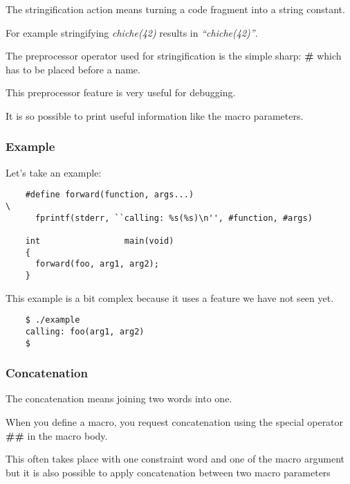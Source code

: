 {\begin{frame}
  The stringification action means turning a code fragment into
  a string constant.

  \nl

  For example stringifying \textit{chiche(42)} results in
  \textit{``chiche(42)''}.

  \nl

  The preprocessor operator used for stringification is the simple sharp:
  \textbf{\#} which has to be placed before a name.

  \nl

  This preprocessor feature is very useful for debugging.

  \nl

  It is so possible to print useful information like the macro parameters.
\end{frame}


\begin{frame}[containsverbatim]
  \frametitle{Example}

  Let's take an example:

  \begin{verbatim}
    #define forward(function, args...)                                  \
      fprintf(stderr, ``calling: %s(%s)\n'', #function, #args)

    int                 main(void)
    {
      forward(foo, arg1, arg2);
    }
  \end{verbatim}

  This example is a bit complex because it uses a feature we have not seen
  yet.

  \begin{verbatim}
    $ ./example
    calling: foo(arg1, arg2)
    $ 
  \end{verbatim}
\end{frame}


\begin{frame}
  \frametitle{Concatenation}

  The concatenation means joining two words into one.

  \nl

  When you define a macro, you request concatenation using the special
  operator \textbf{\#\#} in the macro body.

  \nl

  This often takes place with one constraint word and one of the macro
  argument but it is also possible to apply concatenation between two
  macro parameters
\end{frame}

}
